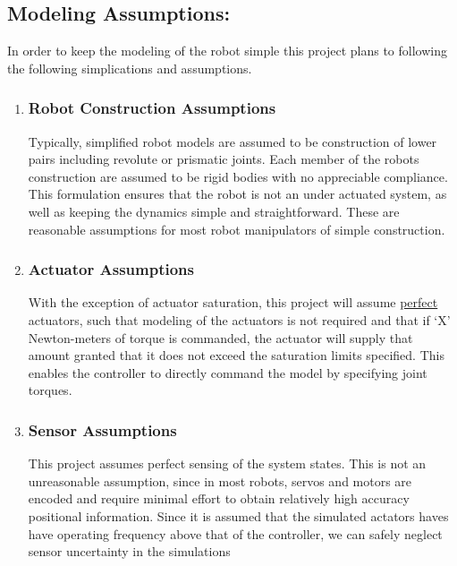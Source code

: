 \documentclass[12px]{article}
\begin{document}
    \subsection*{Modeling Assumptions:}

    In order to keep the modeling of the robot simple this project plans to following the following simplications and assumptions.


        \begin{enumerate}
          \item \subsubsection*{Robot Construction Assumptions}

            Typically, simplified robot models are assumed to be construction of lower pairs including revolute or prismatic joints. Each member of the robots construction are assumed to be rigid bodies with no appreciable compliance. This formulation ensures that the robot is not an under actuated system, as well as keeping the dynamics simple and straightforward. These are reasonable assumptions for most robot manipulators of simple construction.

          \item \subsubsection*{Actuator Assumptions}

          With the exception of actuator saturation, this project will assume \underline{perfect} actuators, such that modeling of the actuators is not required and that if `X' Newton-meters of torque is commanded, the actuator will supply that amount granted that it does not exceed the saturation limits specified. This enables the controller to directly command the model by specifying joint torques.

        \item \subsubsection*{Sensor Assumptions}

        This project assumes perfect sensing of the system states. This is not an unreasonable assumption, since in most robots, servos and motors are encoded and require minimal effort to obtain relatively high accuracy positional information. Since it is assumed that the simulated actators haves have operating frequency above that of the controller, we can safely neglect sensor uncertainty in the simulations


        \end{enumerate}

\printbibliography
\end{document}
